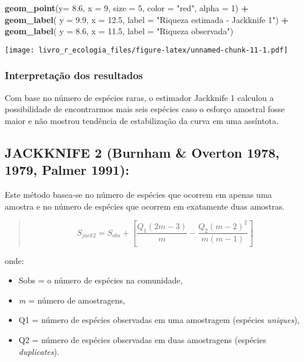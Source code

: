 \documentclass[
]{book}
\newenvironment{Shaded}{\begin{snugshade}}{\end{snugshade}}
\newcommand{\DataTypeTok}[1]{\textcolor[rgb]{0.13,0.29,0.53}{#1}}
\newcommand{\DecValTok}[1]{\textcolor[rgb]{0.00,0.00,0.81}{#1}}
\newcommand{\FloatTok}[1]{\textcolor[rgb]{0.00,0.00,0.81}{#1}}
\newcommand{\KeywordTok}[1]{\textcolor[rgb]{0.13,0.29,0.53}{\textbf{#1}}}
\newcommand{\NormalTok}[1]{#1}
\newcommand{\OperatorTok}[1]{\textcolor[rgb]{0.81,0.36,0.00}{\textbf{#1}}}
\newcommand{\StringTok}[1]{\textcolor[rgb]{0.31,0.60,0.02}{#1}}
\begin{document}
\begin{Shaded}
\begin{Highlighting}[]
\StringTok{  }\KeywordTok{geom_point}\NormalTok{(}\DataTypeTok{y=} \FloatTok{8.6}\NormalTok{, }\DataTypeTok{x =} \DecValTok{9}\NormalTok{, }\DataTypeTok{size =} \DecValTok{5}\NormalTok{, }\DataTypeTok{color =} \StringTok{"red"}\NormalTok{, }\DataTypeTok{alpha =} \DecValTok{1}\NormalTok{) }\OperatorTok{+}\StringTok{ }
\StringTok{  }\KeywordTok{geom_label}\NormalTok{( }\DataTypeTok{y =} \FloatTok{9.9}\NormalTok{, }\DataTypeTok{x =} \FloatTok{12.5}\NormalTok{, }\DataTypeTok{label =} \StringTok{"Riqueza estimada - Jackknife 1"}\NormalTok{) }\OperatorTok{+}
\StringTok{  }\KeywordTok{geom_label}\NormalTok{( }\DataTypeTok{y =} \FloatTok{8.6}\NormalTok{, }\DataTypeTok{x =} \FloatTok{11.5}\NormalTok{, }\DataTypeTok{label =} \StringTok{"Riqueza observada"}\NormalTok{)}
\end{Highlighting}
\end{Shaded}

\texttt{[image: livro\_r\_ecologia\_files/figure-latex/unnamed-chunk-11-1.pdf]}

\hypertarget{interpretauxe7uxe3o-dos-resultados-5}{%
\subsubsection{Interpretação dos resultados}\label{interpretauxe7uxe3o-dos-resultados-5}}

Com base no número de espécies raras, o estimador Jackknife 1 calculou a possibilidade de encontrarmos mais seis espécies caso o esforço amostral fosse maior e não mostrou tendência de estabilização da curva em uma assíntota.

\hypertarget{jackknife-2-burnham-overton-1978-1979-palmer-1991}{%
\subsection{JACKKNIFE 2 (Burnham \& Overton 1978, 1979, Palmer 1991):}\label{jackknife-2-burnham-overton-1978-1979-palmer-1991}}

Este método basea-se no número de espécies que ocorrem em apenas uma amostra e no número de espécies que ocorrem em exatamente duas amostras.

\begin{quote}
\[S_{jack2} = S_{obs} + \left[\frac{Q_1(2m - 3)}{m}-\frac{Q_2(m - 2)^2}{m(m-1)}\right]\]
\end{quote}

onde:

\begin{itemize}
\item
  Sobs = o número de espécies na comunidade,
\item
  \emph{m} = número de amostragens,
\item
  Q1 = número de espécies observadas em uma amostragem (espécies \emph{uniques}),
\item
  Q2 = número de espécies observadas em duas amostragens (espécies \emph{duplicates}).
\end{itemize}
\end{document}
